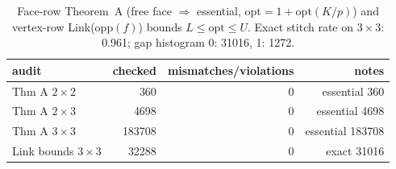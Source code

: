 \begin{table}[h]\centering\small
\caption{Face-row Theorem~A (free face $\Rightarrow$ essential, $\mathrm{opt}=1+\mathrm{opt}(K/p)$) and vertex-row Link($\mathrm{opp}(f)$) bounds $L\le\mathrm{opt}\le U$. Exact stitch rate on $3\times 3$: 0.961; gap histogram {0: 31016, 1: 1272}.}
\label{tab:star-link}
\begin{tabular}{lrrr}\hline
audit & checked & mismatches/violations & notes \\\hline
Thm A $2\times 2$ & 360 & 0 & essential 360 \\
Thm A $2\times 3$ & 4698 & 0 & essential 4698 \\
Thm A $3\times 3$ & 183708 & 0 & essential 183708 \\
Link bounds $3\times 3$ & 32288 & 0 & exact 31016 \\
\hline\end{tabular}\end{table}

